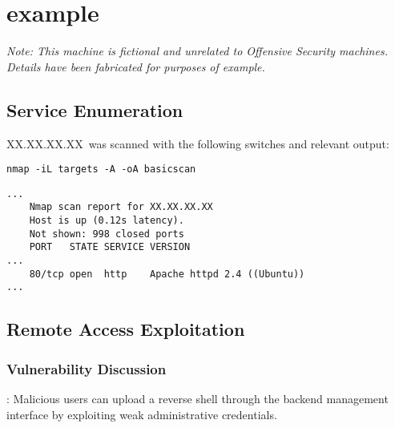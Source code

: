 
\renewcommand{\hostname}{example}
\renewcommand{\os}{Ubuntu 16.04 LTS}
\renewcommand{\ip}{XX.XX.XX.XX}

\renewcommand{\vuln}{}
\renewcommand{\product}{}
\renewcommand{\vulnx}{\vulnPassword}
\renewcommand{\productx}{}
\def\gotroot{}   %

\section{\label{\hostname}\hostname}

\textit{Note: This machine is fictional and unrelated to Offensive Security machines. Details have been fabricated for purposes of example.}

\subsection{Service Enumeration}

\ip\ was scanned with the following switches and relevant output:
\par \texttt{nmap -iL targets -A -oA basicscan}

\begin{lstlisting}[caption={Nmap scan},label={lst:nmap}]
...
	Nmap scan report for XX.XX.XX.XX
	Host is up (0.12s latency).
	Not shown: 998 closed ports
	PORT   STATE SERVICE VERSION
...
	80/tcp open  http    Apache httpd 2.4 ((Ubuntu))
...
\end{lstlisting}




\subsection{Remote Access Exploitation}

\subsubsection{Vulnerability Discussion} 
\vulnPassword: Malicious users can upload a reverse shell through the backend management interface by exploiting weak administrative credentials.


